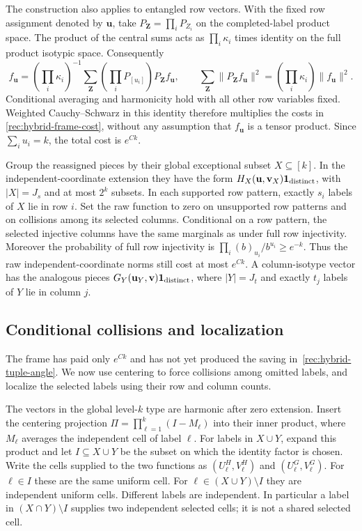 The construction also applies to entangled row vectors.  With the
fixed row assignment denoted by $\mathbf u$, take
$P_{\mathbf Z}=\prod_iP_{Z_i}$ on the completed-label product space.
The product of the central sums acts as $\prod_i\kappa_i$ times
identity on the full product isotypic space.  Consequently
\[
 f_{\mathbf u}=(\prod_i\kappa_i)^{-1}
       \sum_{\mathbf Z}(\prod_iP_{[u_i]})P_{\mathbf Z}f_{\mathbf u},
 \qquad
 \sum_{\mathbf Z}\|P_{\mathbf Z}f_{\mathbf u}\|^2
      =(\prod_i\kappa_i)\|f_{\mathbf u}\|^2.
\]
Conditional averaging and harmonicity hold with all other row
variables fixed.  Weighted Cauchy--Schwarz in this identity therefore
multiplies the costs in \eqref{rec:hybrid-frame-cost}, without any
assumption that $f_{\mathbf u}$ is a tensor product.  Since
$\sum_i u_i=k$, the total cost is $e^{Ck}$.

Group the reassigned pieces by their global exceptional subset
$X\subseteq[k]$.  In the independent-coordinate extension they have
the form $H_X(\mathbf u,\mathbf v_X)\mathbf1_{\rm distinct}$,
with $|X|=J_s$ and at most $2^k$ subsets. In each supported row
pattern, exactly $s_i$ labels of $X$ lie in row $i$.
Set the raw function to zero on unsupported
row patterns and on collisions among its selected columns.
Conditional on a row pattern, the selected injective columns have
the same marginals as under full row injectivity.  Moreover the
probability of full row injectivity is
$\prod_i(b)_{u_i}/b^{u_i}\ge e^{-k}$.
Thus the raw independent-coordinate norms still cost at most
$e^{Ck}$.  A column-isotype vector has the analogous pieces
$G_Y(\mathbf u_Y,\mathbf v)\mathbf1_{\rm distinct}$, where
$|Y|=J_t$ and exactly $t_j$ labels of $Y$ lie in column $j$.

\subsection{Conditional collisions and localization}

The frame has paid only $e^{Ck}$ and has not yet produced the saving
in~\eqref{rec:hybrid-tuple-angle}. We now use centering to force
collisions among omitted labels, and localize the selected labels
using their row and column counts.

The vectors in the global level-$k$ type are harmonic after zero
extension.  Insert the centering projection
$\Pi=\prod_{\ell=1}^k(I-M_\ell)$ into their inner product, where
$M_\ell$ averages the independent cell of label $\ell$.
For labels in $X\cup Y$, expand this product and let
$I\subseteq X\cup Y$ be the subset on which the identity factor
is chosen. Write the cells supplied to the two functions as
$(U_\ell^H,V_\ell^H)$ and $(U_\ell^G,V_\ell^G)$.
For $\ell\in I$ these are the same uniform cell. For
$\ell\in(X\cup Y)\setminus I$ they are independent uniform cells.
Different labels are independent. In particular a label in
$(X\cap Y)\setminus I$ supplies two independent selected cells;
it is not a shared selected cell.


